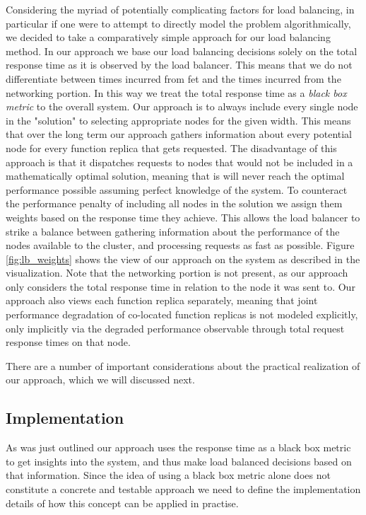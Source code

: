 Considering the myriad of potentially complicating factors for load balancing, in particular if one were to attempt to directly model the problem algorithmically, we decided to take a comparatively simple approach for our load balancing method.
In our approach we base our load balancing decisions solely on the total response time as it is observed by the load balancer. This means that we do not differentiate between times incurred from \gls{fet} and the times incurred from the networking portion. In this way we treat the total response time as a \textit{black box metric} to the overall system.
Our approach is to always include every single node in the "solution" to selecting appropriate nodes for the given width. This means that over the long term our approach gathers information about every potential node for every function replica that gets requested.
The disadvantage of this approach is that it dispatches requests to nodes that would not be included in a mathematically optimal solution, meaning that is will never reach the optimal performance possible assuming perfect knowledge of the system.
To counteract the performance penalty of including all nodes in the solution we assign them weights based on the response time they achieve.
This allows the load balancer to strike a balance between gathering information about the performance of the nodes available to the cluster, and processing requests as fast as possible.
Figure \ref{fig:lb_weights} shows the view of our approach on the system as described in the visualization. Note that the networking portion is not present, as our approach only considers the total response time in relation to the node it was sent to. Our approach also views each function replica separately, meaning that joint performance degradation of co-located function replicas is not modeled explicitly, only implicitly via the degraded performance observable through total request response times on that node.

There are a number of important considerations about the practical realization of our approach, which we will discussed next.


\subsection{Implementation}
As was just outlined our approach uses the response time as a black box metric to get insights into the system, and thus make load balanced decisions based on that information.
Since the idea of using a black box metric alone does not constitute a concrete and testable approach we need to define the implementation details of how this concept can be applied in practise.

